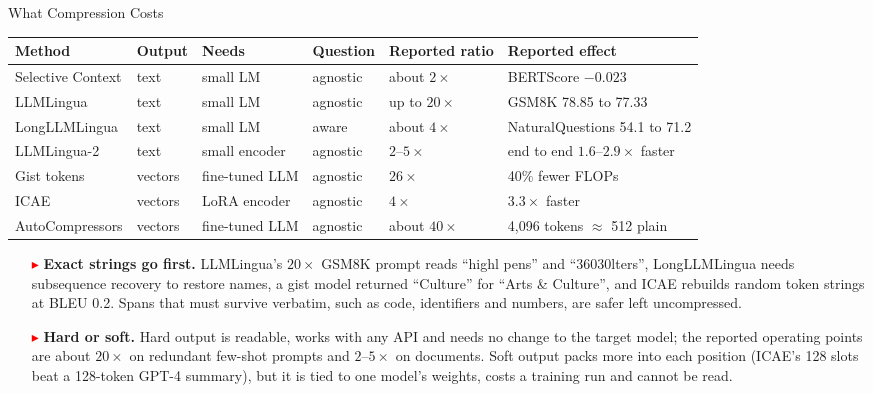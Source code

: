 \begin{frame}{What Compression Costs}
  \centering
  {\scriptsize\setlength{\tabcolsep}{4pt}
  \begin{tabular}{p{2.3cm} p{1.0cm} p{2.0cm} p{1.25cm} p{1.75cm} p{3.6cm}}
    \toprule
    \textbf{Method} & \textbf{Output} & \textbf{Needs} & \textbf{Question} & \textbf{Reported ratio} & \textbf{Reported effect} \\
    \midrule
    Selective Context & text & small LM & agnostic & about $2\times$ & BERTScore $-0.023$ \\
    LLMLingua & text & small LM & agnostic & up to $20\times$ & GSM8K 78.85 to 77.33 \\
    LongLLMLingua & text & small LM & aware & about $4\times$ & NaturalQuestions 54.1 to 71.2 \\
    LLMLingua-2 & text & small encoder & agnostic & $2$--$5\times$ & end to end $1.6$--$2.9\times$ faster \\
    \addlinespace[0.2em]
    Gist tokens & vectors & fine-tuned LLM & agnostic & $26\times$ & 40\% fewer FLOPs \\
    ICAE & vectors & LoRA encoder & agnostic & $4\times$ & $3.3\times$ faster \\
    AutoCompressors & vectors & fine-tuned LLM & agnostic & about $40\times$ & 4,096 tokens $\approx$ 512 plain \\
    \bottomrule
  \end{tabular}\par}
  \vspace{0.3em}
  \raggedright
  \setlength{\parskip}{0.2em}
  \begin{itemize}\scriptsize\itemsep0.1em
    \item[\textcolor{red}{$\blacktriangleright$}] \textbf{Exact strings go first.} LLMLingua's $20\times$ GSM8K prompt reads ``highl pens'' and ``36030lters'', LongLLMLingua needs subsequence recovery to restore names, a gist model returned ``Culture'' for ``Arts \& Culture'', and ICAE rebuilds random token strings at BLEU 0.2. Spans that must survive verbatim, such as code, identifiers and numbers, are safer left uncompressed.
    \item[\textcolor{red}{$\blacktriangleright$}] \textbf{Hard or soft.} Hard output is readable, works with any API and needs no change to the target model; the reported operating points are about $20\times$ on redundant few-shot prompts and $2$--$5\times$ on documents. Soft output packs more into each position (ICAE's 128 slots beat a 128-token GPT-4 summary), but it is tied to one model's weights, costs a training run and cannot be read.

\end{itemize}
\end{frame}
